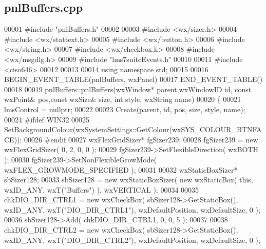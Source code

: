 \subsection{pnl\+Buffers.\+cpp}
\label{pnlBuffers_8cpp_source}

\begin{DoxyCode}
00001 \textcolor{preprocessor}{#include "pnlBuffers.h"}
00002 
00003 \textcolor{preprocessor}{#include <wx/sizer.h>}
00004 \textcolor{preprocessor}{#include <wx/stattext.h>}
00005 \textcolor{preprocessor}{#include <wx/button.h>}
00006 \textcolor{preprocessor}{#include <wx/string.h>}
00007 \textcolor{preprocessor}{#include <wx/checkbox.h>}
00008 \textcolor{preprocessor}{#include <wx/msgdlg.h>}
00009 \textcolor{preprocessor}{#include "lms7suiteEvents.h"}
00010 
00011 \textcolor{preprocessor}{#include <ciso646>}
00012 
00013 
00014 \textcolor{keyword}{using namespace }std;
00015 
00016 BEGIN\_EVENT\_TABLE(pnlBuffers, wxPanel)
00017 END\_EVENT\_TABLE()
00018 
00019 pnlBuffers::pnlBuffers(wxWindow* parent,wxWindowID \textcolor{keywordtype}{id}, const wxPoint& pos,const wxSize& 
      size, \textcolor{keywordtype}{int} style, wxString name)
00020 \{
00021     lmsControl = \textcolor{keyword}{nullptr};
00022 
00023     Create(parent, \textcolor{keywordtype}{id}, pos, size, style, name);
00024 \textcolor{preprocessor}{#ifdef WIN32}
00025     SetBackgroundColour(wxSystemSettings::GetColour(wxSYS\_COLOUR\_BTNFACE));
00026 \textcolor{preprocessor}{#endif}
00027     wxFlexGridSizer* fgSizer239;
00028     fgSizer239 = \textcolor{keyword}{new} wxFlexGridSizer( 0, 2, 0, 0 );
00029     fgSizer239->SetFlexibleDirection( wxBOTH );
00030     fgSizer239->SetNonFlexibleGrowMode( wxFLEX\_GROWMODE\_SPECIFIED );
00031 
00032     wxStaticBoxSizer* sbSizer128;
00033     sbSizer128 = \textcolor{keyword}{new} wxStaticBoxSizer( \textcolor{keyword}{new} wxStaticBox( \textcolor{keyword}{this}, wxID\_ANY, wxT(\textcolor{stringliteral}{"Buffers"}) ), wxVERTICAL );
00034 
00035     chkDIO\_DIR\_CTRL1 = \textcolor{keyword}{new} wxCheckBox( sbSizer128->GetStaticBox(), wxID\_ANY, wxT(\textcolor{stringliteral}{"DIO\_DIR\_CTRL1"}), 
      wxDefaultPosition, wxDefaultSize, 0 );
00036     sbSizer128->Add( chkDIO\_DIR\_CTRL1, 0, 0, 5 );
00037 
00038     chkDIO\_DIR\_CTRL2 = \textcolor{keyword}{new} wxCheckBox( sbSizer128->GetStaticBox(), wxID\_ANY, wxT(\textcolor{stringliteral}{"DIO\_DIR\_CTRL2"}), 
      wxDefaultPosition, wxDefaultSize, 0 );

\end{DoxyCode}

